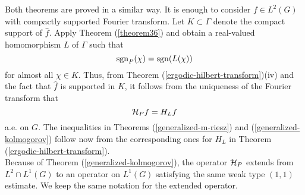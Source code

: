 Both theorems are proved in a similar way.
It is enough to consider $f\in L^2(G)$
with compactly supported Fourier transform.
Let $K\subset\Gamma$ denote the compact support of 
$\widehat{f}$.  Apply Theorem (\ref{theorem36})
and obtain a real-valued homomorphism $L$
of $\Gamma$ such that 
$${\rm sgn}_P(\chi)={\rm sgn}(L(\chi))$$
for almost all $\chi \in K$.  Thus, 
from Theorem (\ref{ergodic-hilbert-transform})(iv)
and the fact that $\widehat{f}$ is supported in
$K$, it follows from the uniqueness 
of the Fourier transform that
$${\cal H}_P f=H_L f$$
a.e. on $G$.  The inequalities in
Theorems (\ref{generalized-m-riesz})
 and (\ref{generalized-kolmogorov}) 
follow now from the corresponding ones 
for $H_L$ in
Theorem (\ref{ergodic-hilbert-transform}).\\
Because of Theorem (\ref{generalized-kolmogorov}),
the operator ${\cal H}_P$ extends from $L^2 \cap L^1 (G)$
to an operator on $L^1(G)$ satisfying the 
same weak type
$(1,1)$ estimate.  We keep the same notation for the 
extended operator.

